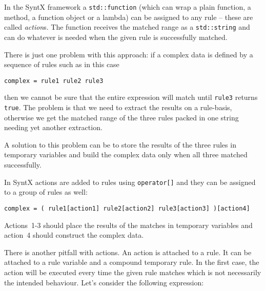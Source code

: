 \documentclass[12pt]{article}
\begin{document}
In the SyntX framework a \texttt{std::function} (which can wrap a plain function, a method, a function object
or a lambda) can be assigned to any rule -- these are called \emph{action}s. The function receives the matched
range as a \texttt{std::string} and can do whatever is needed when the given rule is successfully matched.

There is just one problem with this approach: if a complex data is defined by a sequence of rules such as in
this case

\begin{center}
	\begin{minipage}[h]{0.8\textwidth}
		\begin{lstlisting}[breaklines=true]
complex = rule1 rule2 rule3
		\end{lstlisting}
	\end{minipage}
\end{center}

\noindent then we cannot be sure that the entire expression will match until \texttt{rule3} returns
\texttt{true}. The problem is that we need to extract the results on a rule-basis, otherwise we get the
matched range of the three rules packed in one string needing yet another extraction.

A solution to this problem can be to store the results of the three rules in temporary variables and build the
complex data only when all three matched successfully.

In SyntX actions are added to rules using \texttt{operator[]} and they can be assigned to a group of rules as
well:

\begin{center}
	\begin{minipage}[h]{0.8\textwidth}
		\begin{lstlisting}[breaklines=true]
complex = ( rule1[action1] rule2[action2] rule3[action3] )[action4]
		\end{lstlisting}
	\end{minipage}
\end{center}

Actions~1-3 should place the results of the matches in temporary variables and action~4 should construct the
complex data.

There is another pitfall with actions. An action is attached to a rule. It can be attached to a rule variable
and a compound temporary rule. In the first case, the action will be executed every time the given rule
matches which is not necessarily the intended behaviour. Let's consider the following expression:
\end{document}
